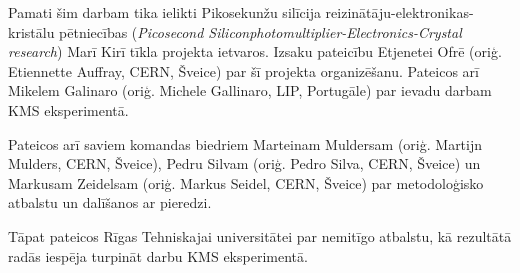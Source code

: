 Pamati šim darbam tika ielikti Pikosekunžu silīcija reizinātāju-elektronikas-kristālu pētniecības (\textit{Picosecond Siliconphotomultiplier-Electronics-Crystal research}) Marī Kirī tīkla projekta ietvaros. Izsaku pateicību Etjenetei Ofrē (oriģ. Etiennette Auffray, CERN, Šveice) par šī projekta organizēšanu. Pateicos arī Mikelem Galinaro (oriģ. Michele Gallinaro, LIP, Portugāle) par ievadu darbam KMS eksperimentā.

Pateicos arī saviem komandas biedriem Marteinam Muldersam (oriģ. Martijn Mulders, CERN, Šveice), Pedru Silvam (oriģ. Pedro Silva, CERN, Šveice) un Markusam Zeidelsam (oriģ. Markus Seidel, CERN, Šveice) par metodoloģisko atbalstu un dalīšanos ar pieredzi.

Tāpat pateicos Rīgas Tehniskajai universitātei par nemitīgo atbalstu, kā rezultātā radās iespēja turpināt darbu KMS eksperimentā.
